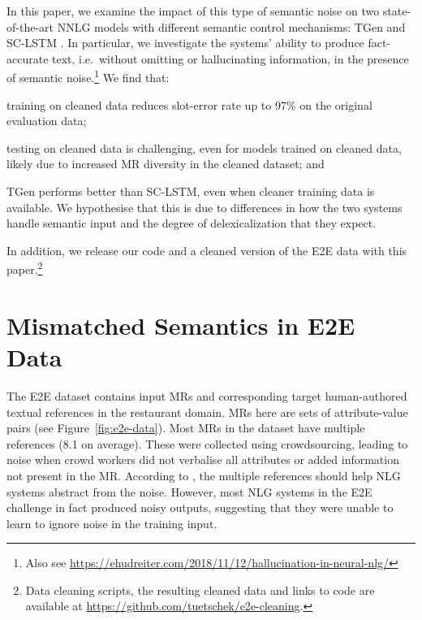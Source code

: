 \documentclass[11pt,a4paper]{article}
\newcommand{\squishlist}{
 \begin{list}{}
  { \setlength{\itemsep}{0pt}
     \setlength{\parsep}{2pt}
     \setlength{\topsep}{2pt}
     \setlength{\partopsep}{0pt}
     \setlength{\leftmargin}{1em}
     \setlength{\labelwidth}{1em}
     \setlength{\labelsep}{0.4em} } }
\newcommand{\squishend}{
  \end{list}  }
\begin{document}
In this paper, we examine the impact of this type of semantic noise on two state-of-the-art NNLG models with different semantic control mechanisms: TGen \cite{Dusek:ACL16} and SC-LSTM \cite{wen:emnlp2015}.
In particular, we investigate the systems' ability to produce fact-accurate text, i.e.\ without omitting or hallucinating information, in the presence of semantic noise.\footnote{Also see \url{https://ehudreiter.com/2018/11/12/hallucination-in-neural-nlg/}}
We find that:
\squishlist
    \item training on cleaned data reduces slot-error rate up to 97\% on the original evaluation data;
\item testing on cleaned data is challenging, even for models trained on cleaned data, likely due to increased MR diversity in the cleaned dataset; and
\item TGen performs better than SC-LSTM, even when cleaner training data is available. We hypothesise that this is due to differences in how the two systems handle semantic input and the degree of delexicalization that they expect.\squishend

In addition, we release our code and a cleaned version of the E2E data with this paper.\footnote{Data cleaning scripts, the resulting cleaned data and links to code are available at \url{https://github.com/tuetschek/e2e-cleaning}.} 



\section{Mismatched Semantics in E2E Data}
\label{sec:mismatched-semantics}

The E2E dataset contains input MRs and corresponding target human-authored textual references in the restaurant domain. 
MRs here are sets of attribute-value pairs (see Figure~\ref{fig:e2e-data}). 
Most MRs in the dataset have multiple references (8.1 on average).
These were collected using crowdsourcing, leading to noise when crowd workers did not verbalise all attributes or added information not present in the MR. 
According to \citet{dusek_evaluating_2019}, the multiple references should help NLG systems abstract from the noise. 
However, most NLG systems in the E2E challenge in fact produced noisy outputs, suggesting that they were unable to learn to ignore noise in the training input.
\end{document}
